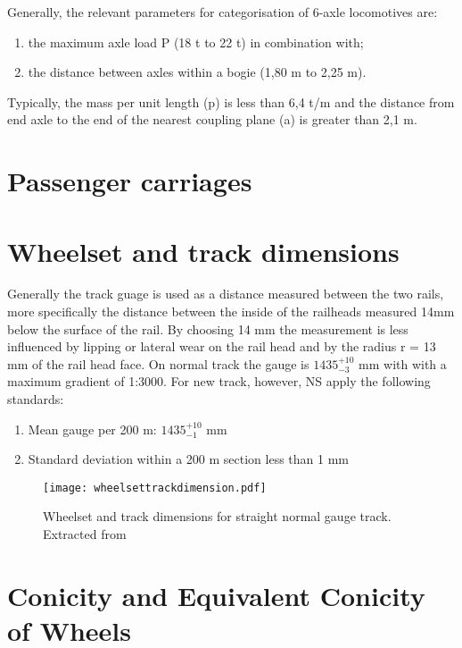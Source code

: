 Generally, the relevant parameters for categorisation of 6-axle locomotives are:

\begin{enumerate}[-]
\item the maximum axle load P (18 t to 22 t) in combination with;
\item the distance between axles within a bogie (1,80 m to 2,25 m).
\end{enumerate}

Typically, the mass per unit length (p) is less than 6,4 t/m and the distance from end axle to the end of the nearest coupling plane (a) is greater than 2,1 m.

\section{Passenger carriages}
 
\section{Wheelset and track dimensions}

Generally the track guage is used as a distance measured between the two rails, more specifically the distance between the inside of the railheads measured 14mm below the surface of the rail. By choosing 14 mm the measurement is less influenced by lipping or lateral wear on the rail head and by the radius r = 13 mm of the rail head face. On normal track the gauge is $1435^{+10}_{-3}$ mm with with a maximum gradient of 1:3000. For new track, however, NS apply the following standards:

\begin{enumerate}
\item Mean gauge per 200 m: $1435^{+10}_{-1}$ mm
\item Standard deviation within a 200 m section less than 1 mm
\end{enumerate}

\begin{figure}[h]
\centering
\texttt{[image: wheelsettrackdimension.pdf]}
\caption{Wheelset and track dimensions for straight normal gauge track. Extracted from \cite[p.17]{esveld2001modern}}
\label{fig:wheelset and track dimensions}
\end{figure}


\section{Conicity and Equivalent Conicity of Wheels}

